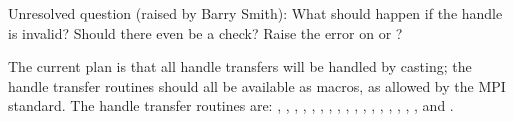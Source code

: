 \documentclass{article}
\begin{document}
Unresolved question (raised by Barry Smith):  What should happen if
the handle is invalid?  Should there even be a check?  Raise the error
on  or ?

The current plan is that all handle transfers will be handled by casting;
the handle transfer routines should all be available as macros, as allowed by
the MPI standard.  The handle transfer routines are:
,
,
,
,
,
,
,
,
,
,
,
,
,
,
,
,
, and
.
\end{document}
